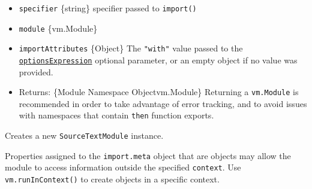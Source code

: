\begin{itemize}
\begin{itemize}
    \begin{itemize}
    \tightlist
    \item
      \texttt{specifier} \{string\} specifier passed to
      \texttt{import()}
    \item
      \texttt{module} \{vm.Module\}
    \item
      \texttt{importAttributes} \{Object\} The \texttt{"with"} value
      passed to the
      \href{https://tc39.es/proposal-import-attributes/\#sec-evaluate-import-call}{\texttt{optionsExpression}}
      optional parameter, or an empty object if no value was provided.
    \item
      Returns: \{Module Namespace Object\textbar vm.Module\} Returning a
      \texttt{vm.Module} is recommended in order to take advantage of
      error tracking, and to avoid issues with namespaces that contain
      \texttt{then} function exports.
    \end{itemize}
  \end{itemize}
\end{itemize}

Creates a new \texttt{SourceTextModule} instance.

Properties assigned to the \texttt{import.meta} object that are objects
may allow the module to access information outside the specified
\texttt{context}. Use \texttt{vm.runInContext()} to create objects in a
specific context.

